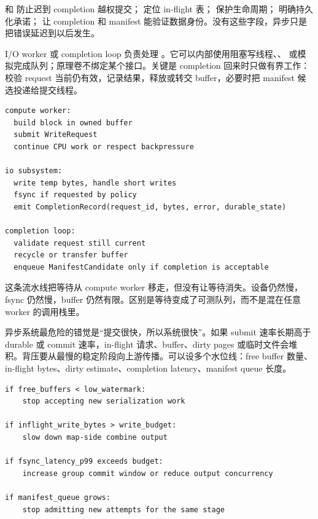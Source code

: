  和  防止迟到 completion 越权提交； 定位 in-flight 表； 保护生命周期； 明确持久化承诺； 让 completion 和 manifest 能验证数据身份。没有这些字段，异步只是把错误延迟到以后发生。

I/O worker 或 completion loop 负责处理 。它可以内部使用阻塞写线程、、 或模拟完成队列；原理卷不绑定某个接口。关键是 completion 回来时只做有界工作：校验 request 当前仍有效，记录结果，释放或转交 buffer，必要时把 manifest 候选投递给提交线程。

\begin{lstlisting}[numbers=none,caption={完成流水线的状态转移}]
compute worker:
  build block in owned buffer
  submit WriteRequest
  continue CPU work or respect backpressure

io subsystem:
  write temp bytes, handle short writes
  fsync if requested by policy
  emit CompletionRecord(request_id, bytes, error, durable_state)

completion loop:
  validate request still current
  recycle or transfer buffer
  enqueue ManifestCandidate only if completion is acceptable
\end{lstlisting}

这条流水线把等待从 compute worker 移走，但没有让等待消失。设备仍然慢，fsync 仍然慢，buffer 仍然有限。区别是等待变成了可测队列，而不是混在任意 worker 的调用栈里。

异步系统最危险的错觉是“提交很快，所以系统很快”。如果 submit 速率长期高于 durable 或 commit 速率，in-flight 请求、buffer、dirty pages 或临时文件会堆积。背压要从最慢的稳定阶段向上游传播。可以设多个水位线：free buffer 数量、in-flight bytes、dirty estimate、completion latency、manifest queue 长度。

\begin{lstlisting}[numbers=none,caption={多层背压水位线}]
if free_buffers < low_watermark:
    stop accepting new serialization work

if inflight_write_bytes > write_budget:
    slow down map-side combine output

if fsync_latency_p99 exceeds budget:
    increase group commit window or reduce output concurrency

if manifest_queue grows:
    stop admitting new attempts for the same stage
\end{lstlisting}

